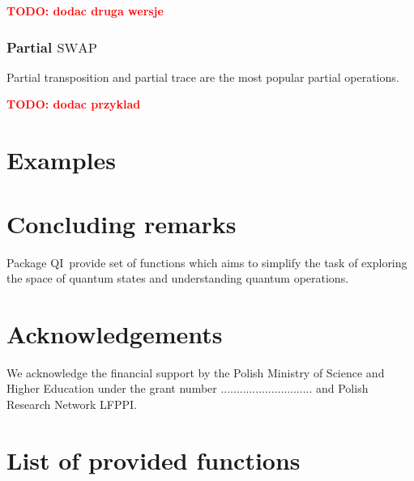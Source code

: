 \documentclass{elsart}
\newcommand{\1}{{\rm 1\hspace{-0.9mm}l}}
\newcommand{\SWAP}{\ensuremath{\mathrm{SWAP}}}
\newcommand{\qi}{QI}
\newcommand{\todo}[1]{\textcolor{red}{\bf TODO: #1}}
\begin{document}
\todo{dodac druga wersje}

\subsubsection{Partial \SWAP}
Partial transposition and partial trace are the most popular partial operations.

\todo{dodac przyklad}

\section{Examples}\label{sec:examples}


\section{Concluding remarks}\label{sec:comclude}
Package \qi\ provide set of functions which aims to simplify the task of
exploring the space of quantum states and understanding quantum operations.

\section*{Acknowledgements}
We acknowledge the financial support by the Polish Ministry of Science and
Higher Education under the grant number ............................. and Polish
Research Network LFPPI. 

\appendix
\section{List of provided functions}





\end{document}
